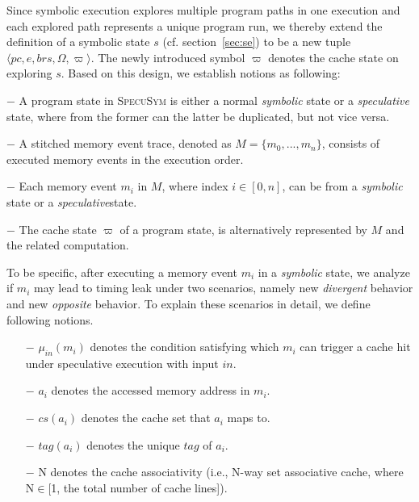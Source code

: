 \documentclass[sigconf, review]{acmart}
\newcommand\ignore[1]{}
\newcommand{\pcon}{\mathit{pc}}
\newcommand{\SpecuSym}{\textsc{SpecuSym} }
\begin{document}
Since symbolic execution explores multiple program paths in one execution 
and each explored path represents a unique program run, we thereby extend 
the definition of a symbolic state $s$ (cf. section~\ref{sec:se}) to be a 
new tuple $\langle \pcon, \mathit{e}, \mathit{brs}, \Omega, \varpi \rangle$. 
The newly introduced symbol $\varpi$ denotes the cache state on exploring $s$.
Based on this design, we establish notions as following:
%
%
\begin{itemize*}
  \item [$-$]A program state in \SpecuSym is either a normal \textit{symbolic} 
    state or a \textit{speculative} state, where from the former can the latter 
    be duplicated, but not vice versa. 
  \item [$-$]A stitched memory event trace, denoted as $\mathit{M}=\mathit{\{m_0,...,m_n\}}$, 
    consists of executed memory events in the execution order.
  \item [$-$]Each memory event $\mathit{m_i}$ in $\mathit{M}$, where index 
    $i\in [0,n]$, can be from a \textit{symbolic} state or a \textit{speculative}state.
  \item [$-$]The cache state $\varpi$ of a program state, is alternatively
    represented by $\mathit{M}$ and the related computation.
\end{itemize*}
%
%
\ignore{
On modeling the cache state, exsiting tools such as CaSym~\cite{BrotzmanLZTK2018} 
maintains and updates cache mappings during symbolic execution; others like 
Chalice~\cite{ChattopadhyayBRZ17} and \textsc{SymSC}~\cite{GuoWW18} uses 
offline constraint solving to to reason about the cache behaviors of memory 
accesses upon concrete cache models. To better coordinate the speculative 
modeling component, \SpecuSym adopts an on-the-fly analysis.
}

To be specific, after executing a memory event $m_i$ in a \textit{symbolic} state, 
we analyze if $\mathit{m_i}$ may lead to timing leak under two scenarios, namely 
new \textit{divergent} behavior and new \textit{opposite} behavior. To explain 
these scenarios in detail, we define following notions.

%
\begin{itemize}
  \item [$-$]$\mathit{\mu_{in}(m_i)}$ denotes the condition satisfying which 
    $\mathit{m_i}$ can trigger a cache hit under speculative execution with 
    input $\mathit{in}$. 
  \item [$-$]$\mathit{a_i}$ denotes the accessed memory address in $\mathit{m_i}$.
  \item [$-$]$\mathit{cs(a_i)}$ denotes the cache set that $\mathit{a_i}$ 
    maps to.
  \item [$-$]$\mathit{tag(a_i)}$ denotes the unique $\mathit{tag}$ of $\mathit{a_i}$.
  \item [$-$]{N} denotes the cache associativity (i.e., N-way set associative 
    cache, where N$\in$[1, the total number of cache lines]). 
\end{itemize}
%
\end{document}

